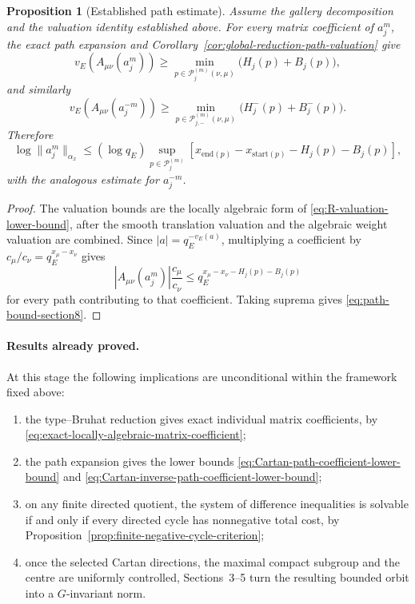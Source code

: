 \documentclass[12pt]{article}
\newtheorem{proposition}[theorem]{Proposition}
\theoremstyle{definition}
\theoremstyle{remark}
\begin{document}
\begin{proposition}[Established path estimate]
\label{prop:established-Cartan-path-estimate}
Assume the gallery decomposition and the valuation identity established
above.  For every matrix coefficient of \(a_j^m\), the exact path expansion
and Corollary~\ref{cor:global-reduction-path-valuation} give
\begin{equation}\label{eq:Cartan-path-coefficient-lower-bound}
 v_E\!\left(A_{\mu\nu}(a_j^m)\right)
 \geq
 \min_{p\in\mathcal P_j^{(m)}(\nu,\mu)}
 \bigl(H_j(p)+B_j(p)\bigr),
\end{equation}
and similarly
\begin{equation}\label{eq:Cartan-inverse-path-coefficient-lower-bound}
 v_E\!\left(A_{\mu\nu}(a_j^{-m})\right)
 \geq
 \min_{p\in\mathcal P_{j,-}^{(m)}(\nu,\mu)}
 \bigl(H_j^-(p)+B_j^-(p)\bigr).
\end{equation}
Therefore
\begin{equation}\label{eq:path-bound-section8}
 \log\|a_j^m\|_{\alpha_x}
 \leq
 (\log q_E)
 \sup_{p\in\mathcal P_j^{(m)}}
 \left[
 x_{\mathrm{end}(p)}
 -
 x_{\mathrm{start}(p)}
 -
 H_j(p)
 -
 B_j(p)
 \right],
\end{equation}
with the analogous estimate for \(a_j^{-m}\).
\end{proposition}

\begin{proof}
The valuation bounds are the locally algebraic form of
\eqref{eq:R-valuation-lower-bound}, after the smooth translation valuation
and the algebraic weight valuation are combined.  Since
\(|a|=q_E^{-v_E(a)}\), multiplying a coefficient by
\(c_\mu/c_\nu=q_E^{x_\mu-x_\nu}\) gives
\[
 |A_{\mu\nu}(a_j^m)|\frac{c_\mu}{c_\nu}
 \leq
 q_E^{x_\mu-x_\nu-H_j(p)-B_j(p)}
\]
for every path contributing to that coefficient.  Taking suprema gives
\eqref{eq:path-bound-section8}.
\end{proof}

\paragraph{Results already proved.}
At this stage the following implications are unconditional within the
framework fixed above:
\begin{enumerate}
 \item the type--Bruhat reduction gives exact individual matrix coefficients,
 by \eqref{eq:exact-locally-algebraic-matrix-coefficient};
 \item the path expansion gives the lower bounds
 \eqref{eq:Cartan-path-coefficient-lower-bound} and
 \eqref{eq:Cartan-inverse-path-coefficient-lower-bound};
 \item on any finite directed quotient, the system of difference
 inequalities is solvable if and only if every directed cycle has
 nonnegative total cost, by
 Proposition~\ref{prop:finite-negative-cycle-criterion};
 \item once the selected Cartan directions, the maximal compact subgroup and
 the centre are uniformly controlled, Sections~3--5 turn the resulting
 bounded orbit into a \(G\)-invariant norm.
\end{enumerate}
\end{document}
